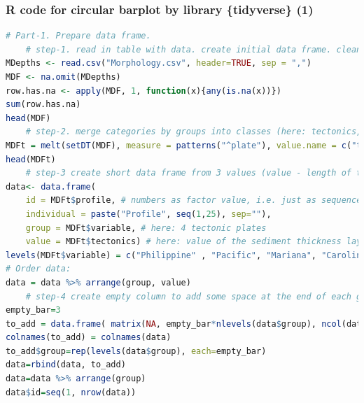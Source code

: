 \documentclass[pdflatex,compress,10pt,
	xcolor={dvipsnames,dvipsnames,svgnames,x11names,table},
	hyperref={colorlinks = true,breaklinks = true, urlcolor = NavyBlue, breaklinks = true}]{beamer}
\begin{document}
\begin{frame}[fragile,shrink=10]\frametitle{R code for circular barplot by library \{tidyverse\} (1)}
\begin{lstlisting}[language=R]
# Part-1. Prepare data frame. 
	# step-1. read in table with data. create initial data frame. clean up from от NA
MDepths <- read.csv("Morphology.csv", header=TRUE, sep = ",")
MDF <- na.omit(MDepths) 
row.has.na <- apply(MDF, 1, function(x){any(is.na(x))}) 
sum(row.has.na) 
head(MDF)
	# step-2. merge categories by groups into classes (here: tectonics, depths, angles)
MDFt = melt(setDT(MDF), measure = patterns("^plate"), value.name = c("tectonics"))
head(MDFt)
	# step-3 create short data frame from 3 values (value - length of the 'flower' petal within the diagram)
data<- data.frame(
	id = MDFt$profile, # numbers as factor value, i.e. just as sequence 1:25
	individual = paste("Profile", seq(1,25), sep=""),
	group = MDFt$variable, # here: 4 tectonic plates
	value = MDFt$tectonics) # here: value of the sediment thickness layer (length of the petal of circle) 
levels(MDFt$variable) = c("Philippine" , "Pacific", "Mariana", "Caroline") # implicitly rename tectonic plates to be shown on the axis X
# Order data: 
data = data %>% arrange(group, value)
	# step-4 create empty column to add some space at the end of each group
empty_bar=3
to_add = data.frame( matrix(NA, empty_bar*nlevels(data$group), ncol(data)))
colnames(to_add) = colnames(data)
to_add$group=rep(levels(data$group), each=empty_bar)
data=rbind(data, to_add)
data=data %>% arrange(group)
data$id=seq(1, nrow(data))
\end{lstlisting}
\end{frame}
\end{document}
